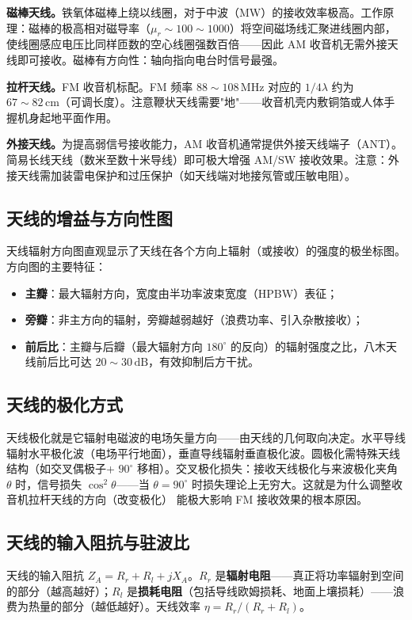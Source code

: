 \documentclass[12pt,UTF8]{ctexbook}
\begin{document}
\textbf{磁棒天线。}铁氧体磁棒上绕以线圈，对于中波（MW）的接收效率极高。工作原理：磁棒的极高相对磁导率（$\mu_r\sim100\sim1000$）将空间磁场线汇聚进线圈内部，使线圈感应电压比同样匝数的空心线圈强数百倍——因此 AM 收音机无需外接天线即可接收。磁棒有方向性：轴向指向电台时信号最强。

\textbf{拉杆天线。}FM 收音机标配。FM 频率 $88\sim108\,\mathrm{MHz}$ 对应的 $1/4\lambda$ 约为 $67\sim82\,\mathrm{cm}$（可调长度）。注意鞭状天线需要"地"——收音机壳内敷铜箔或人体手握机身起地平面作用。

\textbf{外接天线。}为提高弱信号接收能力，AM 收音机通常提供外接天线端子（ANT）。简易长线天线（数米至数十米导线）即可极大增强 AM/SW 接收效果。注意：外接天线需加装雷电保护和过压保护（如天线端对地接氖管或压敏电阻）。

\subsection{天线的增益与方向性图}

天线辐射方向图直观显示了天线在各个方向上辐射（或接收）的强度的极坐标图。方向图的主要特征：
\begin{itemize}
  \item \textbf{主瓣}：最大辐射方向，宽度由半功率波束宽度（HPBW）表征；
  \item \textbf{旁瓣}：非主方向的辐射，旁瓣越弱越好（浪费功率、引入杂散接收）；
  \item \textbf{前后比}：主瓣与后瓣（最大辐射方向 $180^\circ$ 的反向）的辐射强度之比，八木天线前后比可达 $20\sim30\,\mathrm{dB}$，有效抑制后方干扰。
\end{itemize}

\subsection{天线的极化方式}

天线极化就是它辐射电磁波的电场矢量方向——由天线的几何取向决定。水平导线辐射水平极化波（电场平行地面），垂直导线辐射垂直极化波。圆极化需特殊天线结构（如交叉偶极子+ $90^\circ$ 移相）。交叉极化损失：接收天线极化与来波极化夹角 $\theta$ 时，信号损失 $\cos^2\theta$——当 $\theta=90^\circ$ 时损失理论上无穷大。这就是为什么调整收音机拉杆天线的方向（改变极化） 能极大影响 FM 接收效果的根本原因。

\subsection{天线的输入阻抗与驻波比}

天线的输入阻抗 $Z_A = R_r + R_l + jX_A$。$R_r$ 是\textbf{辐射电阻}——真正将功率辐射到空间的部分（越高越好）；$R_l$ 是\textbf{损耗电阻}（包括导线欧姆损耗、地面上壤损耗）——浪费为热量的部分（越低越好）。天线效率 $\eta = R_r/(R_r+R_l)$。
\end{document}
